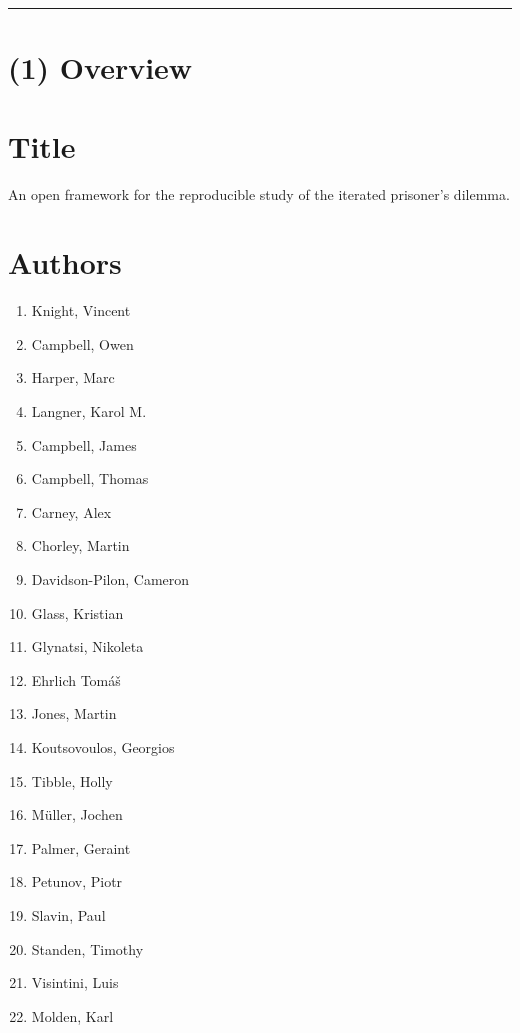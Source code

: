 \documentclass{jors}
\renewcommand\headrule{}
\begin{document}
\pagestyle{fancy}
\renewcommand\headrule{}
\rhead{\textcolor{gray}{UP JORS software Latex paper template version 0.1}}

\rule{\textwidth}{1pt}

\section*{(1) Overview}\label{sec:sec:overview}

\vspace{0.5cm}

\section*{Title}

An open framework for the reproducible study of the iterated prisoner's
dilemma.

\section*{Authors}

\begin{multicols}{2}
    \begin{enumerate}[noitemsep,topsep=0pt]
        \item Knight, Vincent
        \item Campbell, Owen
        \item Harper, Marc
        \item Langner, Karol M.
        \item Campbell, James
        \item Campbell, Thomas
        \item Carney, Alex
        \item Chorley, Martin
        \item Davidson-Pilon, Cameron
        \item Glass, Kristian
        \item Glynatsi, Nikoleta
        \item Ehrlich Tom{\'a}{\v s}
        \item Jones, Martin
        \item Koutsovoulos, Georgios
        \item Tibble, Holly
        \item M{\"u}ller, Jochen
        \item Palmer, Geraint
        \item Petunov, Piotr
        \item Slavin, Paul
        \item Standen, Timothy
        \item Visintini, Luis
        \item Molden, Karl
    \end{enumerate}
\end{multicols}
\end{document}
